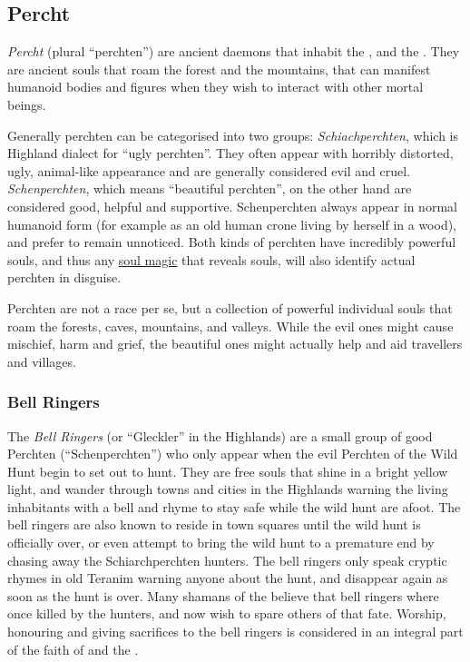 \subsection{Percht}
\label{sec:Percht}

\emph{Percht} (plural ``perchten'') are ancient daemons that inhabit the
, and the . They
are ancient souls that roam the forest and the mountains, that can manifest
humanoid bodies and figures when they wish to interact with other mortal
beings.

Generally perchten can be categorised into two groups: \emph{Schiachperchten},
which is Highland dialect for ``ugly perchten''. They often appear with
horribly distorted, ugly, animal-like appearance and are generally considered
evil and cruel. \emph{Schenperchten}, which means ``beautiful perchten'', on
the other hand are considered good, helpful and supportive. Schenperchten
always appear in normal humanoid form (for example as an old human crone
living by herself in a wood), and prefer to remain unnoticed. Both kinds of
perchten have incredibly powerful souls, and thus any \hyperref[sec:Soul
  Magic]{soul magic} that reveals souls, will also identify actual perchten in
disguise.

Perchten are not a race per se, but a collection of powerful individual souls
that roam the forests, caves, mountains, and valleys. While the evil ones might
cause mischief, harm and grief, the beautiful ones might actually help and aid
travellers and villages.

\subsubsection{Bell Ringers}
\label{sec:Bell Ringers}

The \emph{Bell Ringers} (or ``Gleckler'' in the Highlands) are a small group of
good Perchten (``Schenperchten'') who only appear when the evil Perchten
of the Wild Hunt begin to set out to hunt. They are free souls that shine
in a bright yellow light, and wander through towns and cities in the Highlands
warning the living inhabitants with a bell and rhyme to stay safe while
the wild hunt are afoot. The bell ringers are also known to reside in town
squares until the wild hunt is officially over, or even attempt to bring the
wild hunt to a premature end by chasing away the Schiarchperchten hunters. The
bell ringers only speak cryptic rhymes in old Teranim warning anyone about
the hunt, and disappear again as soon as the hunt is over. Many shamans of the
 believe that bell ringers where once killed by the
hunters, and now wish to spare others of that fate. Worship, honouring and
giving sacrifices to the bell ringers is considered in an integral part of the
faith of  and the .

